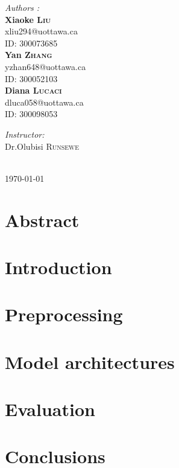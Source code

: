 \documentclass[10pt]{article}
\begin{document}
\begin{titlepage}
\begin{minipage}{0.4\textwidth}
\begin{flushleft} \large
\emph{Authors :}\\\textbf{Xiaoke \textsc{Liu}}\\xliu294@uottawa.ca\\ID: 300073685
\\\textbf{Yan \textsc{Zhang}}\\yzhan648@uottawa.ca\\ID: 300052103
\\\textbf{Diana \textsc{Lucaci}}\\dluca058@uottawa.ca\\ID: 300098053
\end{flushleft}
\end{minipage}
\begin{minipage}{0.4\textwidth}
\begin{flushright} \large
\emph{Instructor:} \\
Dr.Olubisi \textsc{Runsewe}\\
\end{flushright}
\end{minipage}\\[0.5cm]
{\large \today}\\[1cm]

\vfill %

\end{titlepage}

\tableofcontents          %
\listoffigures
\listoftables
\newpage
\section{Abstract}


\section{Introduction}


\section{Preprocessing}


\section{Model architectures}


\section{Evaluation} \label{evaluation}



\section{Conclusions}

\clearpage


\begin{appendices}\label{app}

\end{appendices}
\end{document}
